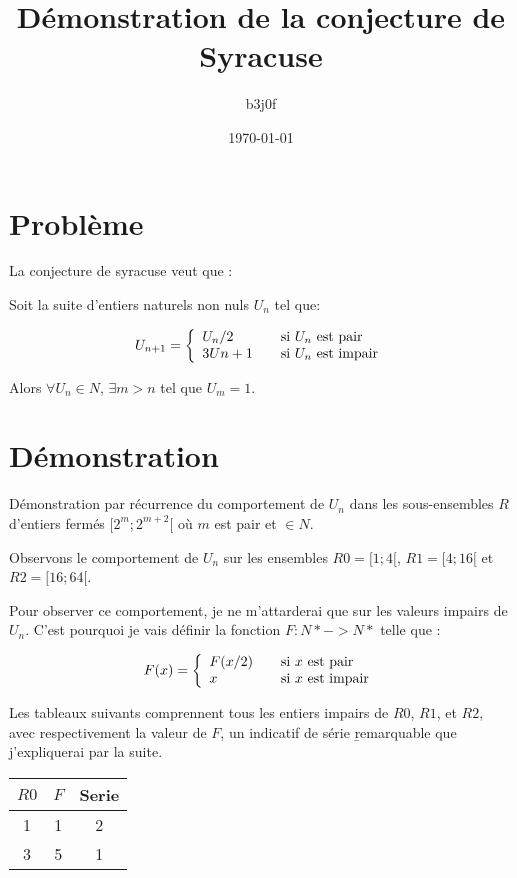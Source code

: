 \documentclass{book}
\title{D\'emonstration de la conjecture de Syracuse}
\author{b3j0f}
\date{\today}
\begin{document}
\label{start}

\maketitle

\section{Probl\`eme}

La conjecture de syracuse veut que :

Soit la suite d'entiers naturels non nuls $U_n$ tel que:

\[U_{n+1} = \left\{
\begin{array}{l l}
  U_n/2 & \quad \text{si $U_n$ est pair}\\
  3Un+1 & \quad \text{si $U_n$ est impair}\\ \end{array} \right. \]

Alors $\forall U_n \in N$, $\exists m > n$ tel que $U_m = 1$.

\section{D\'emonstration}

D\'emonstration par r\'ecurrence du comportement de $U_n$ dans les sous-ensembles $R$ d'entiers ferm\'es $[2^m; 2^{m+2}[$ o\`u $m$ est pair et $\in N$.

Observons le comportement de $U_n$ sur les ensembles $R0=[1; 4[$, $R1=[4; 16[$ et $R2=[16; 64[$.

Pour observer ce comportement, je ne m'attarderai que sur les valeurs impairs de $U_n$. C'est pourquoi je vais d\'efinir la fonction $F: N* -> N*$ telle que :

\[F(x) = \left\{
\begin{array}{l l}
  F(x/2) & \quad \text{si $x$ est pair}\\
  x & \quad \text{si $x$ est impair}\\ \end{array} \right. \]

Les tableaux suivants comprennent tous les entiers impairs de $R0$, $R1$, et $R2$, avec respectivement la valeur de $F$, un indicatif de s\'erie \b{remarquable} que j'expliquerai par la suite.

\begin{tabular}{|c|c|c|}
	\hline
	$R0$ & $F$ & Serie \\
	\hline
	1 & 1 & 2 \\
	\hline
	3 & 5 & 1 \\
	\hline
\end{tabular}
\end{document}

